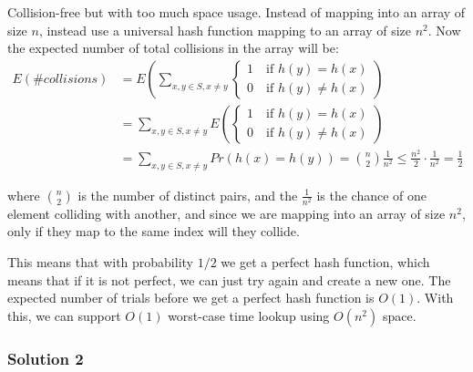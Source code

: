                 Collision-free but with too much space usage.
                Instead of mapping into an array of size $n$, instead use a universal hash function mapping to an array of size $n^2$.
                Now the expected number of total collisions in the array will be:
                \begin{align*}
                    E(\#collisions)
                    &= E\left( \sum_{x,y \in S, x \not = y}
                        \begin{cases}
                            1 \quad \text{if } h(y) = h(x) \\
                            0 \quad \text{if } h(y) \not = h(x)
                        \end{cases}
                        \right) \\
                    &= \sum_{x,y \in S, x \not = y} E\left(
                        \begin{cases}
                            1 \quad \text{if } h(y) = h(x) \\
                            0 \quad \text{if } h(y) \not = h(x)
                        \end{cases}
                        \right) \\
                    &= \sum_{x, y \in S, x \not = y} Pr(h(x) = h(y)) = \binom{n}{2} \frac{1}{n^2} \leq \frac{n^2}{2} \cdot \frac{1}{n^2} = \frac{1}{2}
                \end{align*}

                where $\binom{n}{2}$ is the number of distinct pairs, and the $\frac{1}{n^2}$ is the chance of one element colliding with another, and since we are mapping into an array of size $n^2$, only if they map to the same index will they collide.

                This means that with probability $1/2$ we get a perfect hash function, which means that if it is not perfect, we can just try again and create a new one.
                The expected number of trials before we get a perfect hash function is $O(1)$.
                With this, we can support $O(1)$ worst-case time lookup using $O(n^2)$ space.

            \subsubsection{Solution 2}

